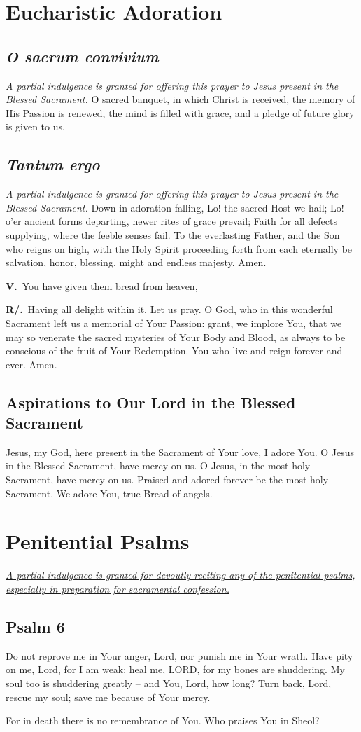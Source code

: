 \documentclass[12pt]{article}
\newcommand{\prayersection}[1]{\section{#1}}
\newcommand{\prayertitle}[1]{\subsection{#1}}
\newcommand{\indulgencedprayertitle}[1]{\prayertitle{#1 \protect\kreuz}}
\newcommand{\foreign}[1]{\textsl{#1}}
\newcommand{\note}[1]{{\small{\textsl{#1}}}\newline}
\newcommand{\linkednote}[2]{\hyperlink{#1}{\note{#2}}}
\newcommand{\versicle}{\textbf{V.}}
\newcommand{\response}{\textbf{R/.}}
\begin{document}
\newpage

\prayersection{Eucharistic Adoration}
\prayertitle{\foreign{O sacrum convivium}}
\note{A partial indulgence is granted for offering this prayer to Jesus present in the Blessed Sacrament.}
O sacred banquet, in which Christ is received, the memory of His Passion is renewed, the mind is filled with grace, and a pledge of future glory is given to us.

\prayertitle{\foreign{Tantum ergo}}
\note{A partial indulgence is granted for offering this prayer to Jesus present in the Blessed Sacrament.}
Down in adoration falling,
Lo! the sacred Host we hail;
Lo! o'er ancient forms departing,
newer rites of grace prevail;
Faith for all defects supplying,
where the feeble senses fail.
To the everlasting Father,
and the Son who reigns on high,
with the Holy Spirit proceeding
forth from each eternally
be salvation, honor, blessing,
might and endless majesty.
Amen.

\versicle\ You have given them bread from heaven,

\response\ Having all delight within it.
Let us pray.
O God, who in this wonderful Sacrament left us a memorial of Your Passion:
grant, we implore You, that we may so venerate the sacred mysteries of Your Body and Blood, as always to be conscious of the fruit of Your Redemption.
You who live and reign forever and ever.
Amen.

\prayertitle{Aspirations to Our Lord in the Blessed Sacrament}
Jesus, my God, here present in the Sacrament of Your love, I adore You. 
O Jesus in the Blessed Sacrament, have mercy on us. 
O Jesus, in the most holy Sacrament, have mercy on us. 
Praised and adored forever be the most holy Sacrament. 
We adore You, true Bread of angels. 

\newpage

\prayersection{Penitential Psalms}
\linkednote{grant9}{A partial indulgence is granted for devoutly reciting any of the penitential psalms, especially in preparation for sacramental confession.}
\indulgencedprayertitle{Psalm 6}
Do not reprove me in Your anger, Lord,
nor punish me in Your wrath.
Have pity on me, Lord, for I am weak;
heal me, LORD, for my bones are shuddering.
My soul too is shuddering greatly -- and You, Lord, how long?
Turn back, Lord, rescue my soul;
save me because of Your mercy.

For in death there is no remembrance of You.
Who praises You in Sheol?
\end{document}
